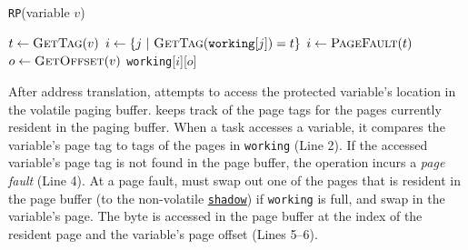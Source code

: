 
\begin{algorithm}[t]
	\caption{\texttt{RP}(variable $v$)}
	\label{algo:rwar}
	\scriptsize
	\begin{algorithmic}[1]
		\State $t \leftarrow \Call{GetTag}{v}$ 
        \State $i \gets \{ j\ |\ \Call{GetTag}{\texttt{working}[j]} = t \}$ 
		 
		\State	$i \gets \Call{PageFault}{t}$ 
		\EndIf
		\State $o \leftarrow \Call{GetOffset}{v}$ 		
		\State \Return \texttt{working}[$i$][$o$]  
	\end{algorithmic}
\end{algorithm}

After address translation, \sys attempts to access the protected variable's location in the volatile paging buffer. \sys keeps track of the page tags for the pages currently resident in the paging buffer. When a task accesses a variable, it compares the variable's page tag to tags of the pages in {\tt working} (Line 2).
%
%
If the accessed variable's page tag is not found in the page buffer, the operation incurs a {\em page fault} (Line 4). At a page fault, \sys must swap out one of the pages that is resident in the page buffer (to the non-volatile \texttt{\underline{shadow}}) if \texttt{working} is full, and swap in the variable's page.
%
The byte is accessed in the page buffer at the index of the resident page and the variable's page offset (Lines 5--6).


